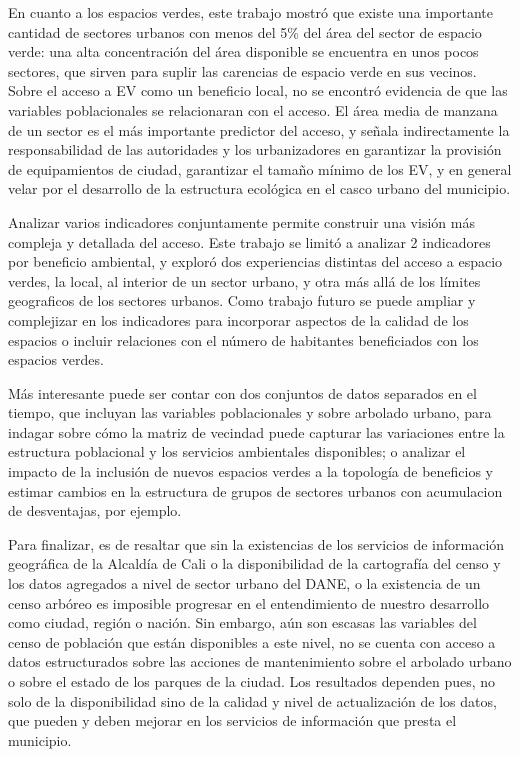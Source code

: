 \documentclass[12pt,a4paper,openany]{book}
\theoremstyle{definition}
\theoremstyle{definition}
\theoremstyle{definition}
\theoremstyle{remark}
\begin{document}
En cuanto a los espacios verdes, este trabajo mostró que existe una
importante cantidad de sectores urbanos con menos del 5\% del área del
sector de espacio verde: una alta concentración del área disponible se
encuentra en unos pocos sectores, que sirven para suplir las carencias
de espacio verde en sus vecinos. Sobre el acceso a EV como un beneficio
local, no se encontró evidencia de que las variables poblacionales se
relacionaran con el acceso. El área media de manzana de un sector es el
más importante predictor del acceso, y señala indirectamente la
responsabilidad de las autoridades y los urbanizadores en garantizar la
provisión de equipamientos de ciudad, garantizar el tamaño mínimo de los
EV, y en general velar por el desarrollo de la estructura ecológica en
el casco urbano del municipio.

Analizar varios indicadores conjuntamente permite construir una visión
más compleja y detallada del acceso. Este trabajo se limitó a analizar 2
indicadores por beneficio ambiental, y exploró dos experiencias
distintas del acceso a espacio verdes, la local, al interior de un
sector urbano, y otra más allá de los límites geograficos de los
sectores urbanos. Como trabajo futuro se puede ampliar y complejizar en
los indicadores para incorporar aspectos de la calidad de los espacios o
incluir relaciones con el número de habitantes beneficiados con los
espacios verdes.

Más interesante puede ser contar con dos conjuntos de datos separados en
el tiempo, que incluyan las variables poblacionales y sobre arbolado
urbano, para indagar sobre cómo la matriz de vecindad puede capturar las
variaciones entre la estructura poblacional y los servicios ambientales
disponibles; o analizar el impacto de la inclusión de nuevos espacios
verdes a la topología de beneficios y estimar cambios en la estructura
de grupos de sectores urbanos con acumulacion de desventajas, por
ejemplo.

Para finalizar, es de resaltar que sin la existencias de los servicios
de información geográfica de la Alcaldía de Cali o la disponibilidad de
la cartografía del censo y los datos agregados a nivel de sector urbano
del DANE, o la existencia de un censo arbóreo es imposible progresar en
el entendimiento de nuestro desarrollo como ciudad, región o nación. Sin
embargo, aún son escasas las variables del censo de población que están
disponibles a este nivel, no se cuenta con acceso a datos estructurados
sobre las acciones de mantenimiento sobre el arbolado urbano o sobre el
estado de los parques de la ciudad. Los resultados dependen pues, no
solo de la disponibilidad sino de la calidad y nivel de actualización de
los datos, que pueden y deben mejorar en los servicios de información
que presta el municipio.
\end{document}
